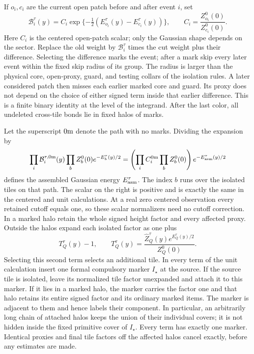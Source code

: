 If \(o_i,c_i\) are the current open patch before and after event
\(i\), set
\begin{equation}\label{ent:proxy}
 \mathcal B_i^\tau(y)=C_i
          \exp\{-\tfrac12(E_{o_i}^\tau(y)-E_{c_i}^\tau(y))\},
 \qquad C_i=\frac{Z_{o_i}^0(0)}{Z_{c_i}^0(0)}.
\end{equation}
Here \(C_i\) is the centered open-patch scalar; only the Gaussian
shape depends on the sector.  Replace the old
weight by \(\mathcal B_i^\tau\) times the cut weight plus their
difference.  Selecting the difference marks the event; after a
mark skip every later event within the fixed skip radius of its
group.  The radius is larger than the physical core, open-proxy,
guard, and testing collars of the isolation rules.  A later considered patch then misses each earlier marked
core and guard.  Its proxy does not depend on the choice of either
signed term inside that earlier difference.  This is a finite
binary identity at the level of the integrand.  After the last
color, all undeleted cross-tile bonds lie in fixed halos of marks.

Let the superscript \(0{\rm m}\) denote the path with no marks.
Dividing the expansion by
\[
 \prod_i\mathcal B_i^{\tau,0{\rm m}}(y)
              \prod_b Z_b^0(0)e^{-E_b^\tau(y)/2}
   =\left(\prod_i C_i^{0{\rm m}}\prod_b Z_b^0(0)\right)
                   e^{-E_{\rm asm}^\tau(y)/2}
\]
defines the assembled Gaussian energy \(E_{\rm asm}^\tau\).
The index \(b\) runs over the isolated tiles on that path.
The scalar on the right is positive and is exactly the same in
the centered and unit calculations.  At a real zero centered
observation every retained cutoff equals one, so these scalar
normalizers need no cutoff correction.  In a marked halo retain
the whole signed height factor and every affected proxy.  Outside
the halos expand each isolated factor as one plus
\[
 T_Q^\tau(y)-1,\qquad
 T_Q^\tau(y)=
          \frac{\widehat Z_Q^\tau(y)e^{E_Q^\tau(y)/2}}
                    {Z_Q^0(0)} .
\]
Selecting this second term selects an additional tile.  In every
term of the unit calculation insert one formal compulsory marker
\(I_\star\) at the source.  If the source tile is isolated, leave
its normalized tile factor unexpanded and attach it to this marker.
If it lies in a marked halo, the marker carries the factor one and
that halo retains its entire signed factor and its ordinary marked
items.  The marker is adjacent to them and hence labels their
component.  In particular, an arbitrarily long chain of attached
halos keeps the union of their individual covers; it is not hidden
inside the fixed primitive cover of \(I_\star\).  Every term has
exactly one marker.  Identical proxies and final tile factors off
the affected halos cancel exactly, before any estimates are made.

